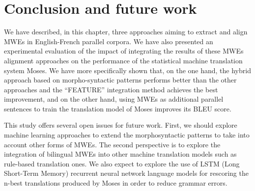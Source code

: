 \documentclass[output=paper,modfonts,nonflat]{langsci/langscibook}
\begin{document}
\section{Conclusion and future work}

We have described, in this chapter, three approaches aiming to extract and align MWEs in English-French parallel corpora. We have also presented an experimental evaluation of the impact of integrating the results of these MWEs alignment approaches on the performance of the statistical machine translation system Moses. We have more specifically shown that, on the one hand, the hybrid approach based on morpho-syntactic patterns performs better than the other approaches and the ``FEATURE'' integration method achieves the best improvement, and on the other hand, using MWEs as additional parallel sentences to train the translation model of Moses improves its BLEU score.

This study offers several open issues for future work. First, we should explore machine learning approaches to extend the morphosyntactic patterns to take into account other forms of MWEs. The second perspective is to explore the integration of bilingual MWEs into other machine translation models such as rule-based translation ones. We also expect to explore the use of LSTM (Long Short-Term Memory) recurrent neural network language models for rescoring the n-best translations produced by Moses in order to reduce grammar errors.



\end{document}

